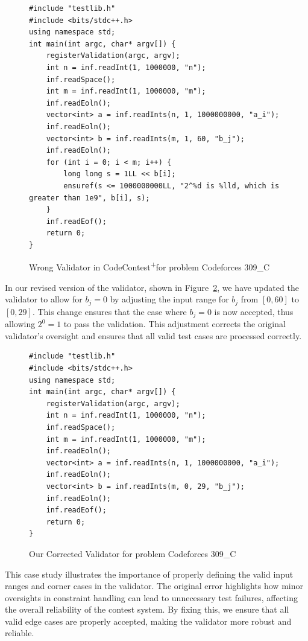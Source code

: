 \documentclass[11pt]{article}
\newcommand{\pl}{\textsuperscript{+}}
\begin{document}
\begin{figure}[t]
\centering
\begin{minipage}{0.95\textwidth}
\begin{lstlisting}
#include "testlib.h"
#include <bits/stdc++.h>
using namespace std;
int main(int argc, char* argv[]) {
    registerValidation(argc, argv);
    int n = inf.readInt(1, 1000000, "n");
    inf.readSpace();
    int m = inf.readInt(1, 1000000, "m");
    inf.readEoln();
    vector<int> a = inf.readInts(n, 1, 1000000000, "a_i");
    inf.readEoln();
    vector<int> b = inf.readInts(m, 1, 60, "b_j");
    inf.readEoln();
    for (int i = 0; i < m; i++) {
        long long s = 1LL << b[i];
        ensuref(s <= 1000000000LL, "2^%d is %lld, which is greater than 1e9", b[i], s);
    }
    inf.readEof();
    return 0;
}
\end{lstlisting}
\end{minipage}
\caption{Wrong Validator in CodeContest\pl for problem Codeforces 309\_C}
\label{fig:wrong-validator}
\end{figure}

In our revised version of the validator, shown in Figure~\ref{fig:correct-validator}, we have updated the validator to allow for $b_j = 0$ by adjusting the input range for $b_j$ from $[0, 60]$ to $[0, 29]$. This change ensures that the case where $b_j = 0$ is now accepted, thus allowing $2^0 = 1$ to pass the validation. This adjustment corrects the original validator's oversight and ensures that all valid test cases are processed correctly.

\begin{figure}[t]
\centering
\begin{minipage}{0.95\textwidth}
\begin{lstlisting}
#include "testlib.h"
#include <bits/stdc++.h>
using namespace std;
int main(int argc, char* argv[]) {
    registerValidation(argc, argv);
    int n = inf.readInt(1, 1000000, "n");
    inf.readSpace();
    int m = inf.readInt(1, 1000000, "m");
    inf.readEoln();
    vector<int> a = inf.readInts(n, 1, 1000000000, "a_i");
    inf.readEoln();
    vector<int> b = inf.readInts(m, 0, 29, "b_j");
    inf.readEoln();
    inf.readEof();
    return 0;
}
\end{lstlisting}
\end{minipage}
\caption{Our Corrected Validator for problem Codeforces 309\_C}
\label{fig:correct-validator}
\end{figure}

This case study illustrates the importance of properly defining the valid input ranges and corner cases in the validator. The original error highlights how minor oversights in constraint handling can lead to unnecessary test failures, affecting the overall reliability of the contest system. By fixing this, we ensure that all valid edge cases are properly accepted, making the validator more robust and reliable.
\end{document}
